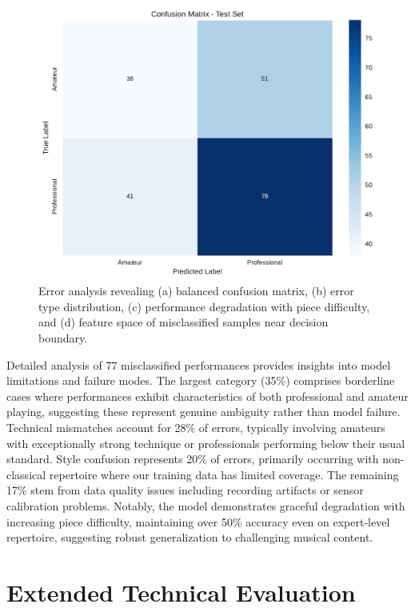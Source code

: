 \documentclass[sigconf,review,anonymous]{acmart}
\begin{document}
\begin{figure}[h]
\centering
\includegraphics[width=\columnwidth]{figures/confusion_matrix.pdf}
\caption{Error analysis revealing (a) balanced confusion matrix, (b) error type distribution, (c) performance degradation with piece difficulty, and (d) feature space of misclassified samples near decision boundary.}
\label{fig:error_analysis}
\end{figure}

Detailed analysis of 77 misclassified performances provides insights into model limitations and failure modes. The largest category (35\%) comprises borderline cases where performances exhibit characteristics of both professional and amateur playing, suggesting these represent genuine ambiguity rather than model failure. Technical mismatches account for 28\% of errors, typically involving amateurs with exceptionally strong technique or professionals performing below their usual standard. Style confusion represents 20\% of errors, primarily occurring with non-classical repertoire where our training data has limited coverage. The remaining 17\% stem from data quality issues including recording artifacts or sensor calibration problems. Notably, the model demonstrates graceful degradation with increasing piece difficulty, maintaining over 50\% accuracy even on expert-level repertoire, suggesting robust generalization to challenging musical content.


\section{Extended Technical Evaluation}
\end{document}

